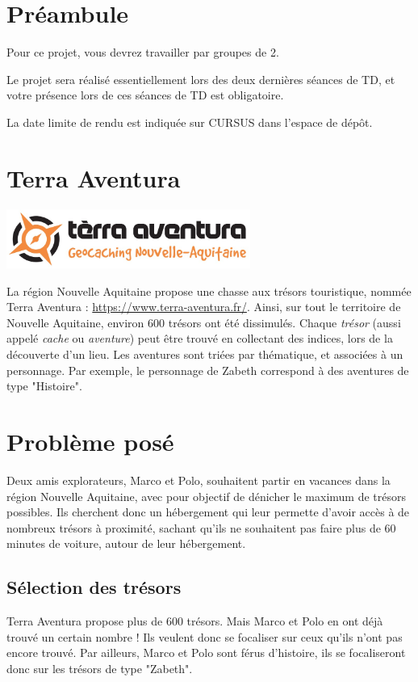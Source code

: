 \documentclass[11pt,a4paper]{article}
\begin{document}
\section{Préambule}

Pour ce projet, vous devrez travailler par groupes de 2.

Le projet sera réalisé essentiellement lors des deux dernières séances de TD, et votre présence lors de ces séances de TD est obligatoire.

La date limite de rendu est indiquée sur CURSUS dans l’espace de dépôt.

\section{Terra Aventura}

\begin{center}
\includegraphics[width=8cm]{ProjetTerraAventura/logo.jpg}
\end{center}

La région Nouvelle Aquitaine propose une chasse aux trésors touristique, nommée Terra Aventura : \url{https://www.terra-aventura.fr/}. Ainsi, sur tout le territoire de Nouvelle Aquitaine, environ 600 trésors ont été dissimulés. Chaque \emph{trésor} (aussi appelé \emph{cache} ou \emph{aventure}) peut être trouvé en collectant des indices, lors de la découverte d'un lieu. Les aventures sont triées par thématique, et associées à un personnage. Par exemple, le personnage de Zabeth correspond à des aventures de type "Histoire". 

\section{Problème posé}

Deux amis explorateurs, Marco et Polo, souhaitent partir en vacances dans la région Nouvelle Aquitaine, avec pour objectif de dénicher le maximum de trésors possibles. Ils cherchent donc un hébergement qui leur permette d'avoir accès à de nombreux trésors à proximité, sachant qu'ils ne souhaitent pas faire plus de 60 minutes de voiture, autour de leur hébergement. 

\subsection{Sélection des trésors}\label{tresor}
Terra Aventura propose plus de 600 trésors. Mais Marco et Polo en ont déjà trouvé un certain nombre ! Ils veulent donc se focaliser sur ceux qu'ils n'ont pas encore trouvé. 
Par ailleurs, Marco et Polo sont férus d'histoire, ils se focaliseront donc sur les trésors de type "Zabeth". 
\end{document}

